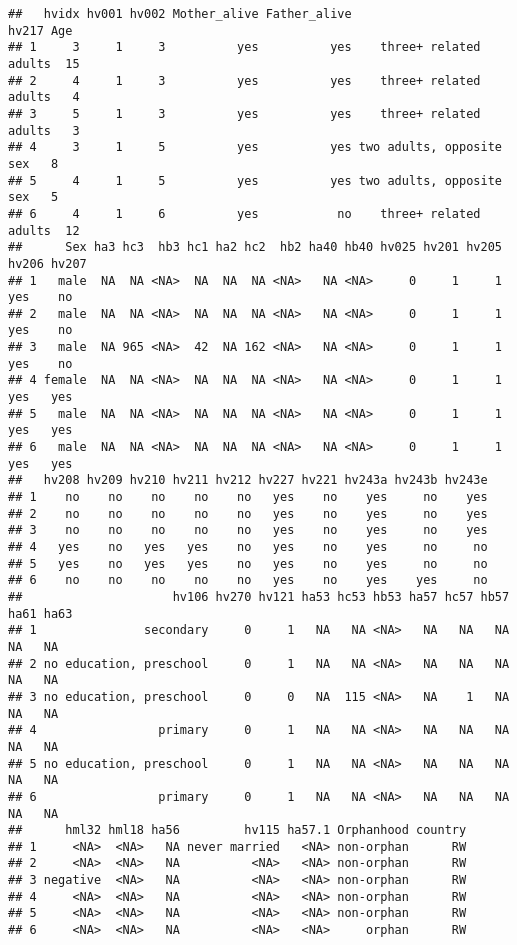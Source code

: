 \documentclass[
]{article}
\begin{document}
\begin{verbatim}
##   hvidx hv001 hv002 Mother_alive Father_alive                    hv217 Age
## 1     3     1     3          yes          yes    three+ related adults  15
## 2     4     1     3          yes          yes    three+ related adults   4
## 3     5     1     3          yes          yes    three+ related adults   3
## 4     3     1     5          yes          yes two adults, opposite sex   8
## 5     4     1     5          yes          yes two adults, opposite sex   5
## 6     4     1     6          yes           no    three+ related adults  12
##      Sex ha3 hc3  hb3 hc1 ha2 hc2  hb2 ha40 hb40 hv025 hv201 hv205 hv206 hv207
## 1   male  NA  NA <NA>  NA  NA  NA <NA>   NA <NA>     0     1     1   yes    no
## 2   male  NA  NA <NA>  NA  NA  NA <NA>   NA <NA>     0     1     1   yes    no
## 3   male  NA 965 <NA>  42  NA 162 <NA>   NA <NA>     0     1     1   yes    no
## 4 female  NA  NA <NA>  NA  NA  NA <NA>   NA <NA>     0     1     1   yes   yes
## 5   male  NA  NA <NA>  NA  NA  NA <NA>   NA <NA>     0     1     1   yes   yes
## 6   male  NA  NA <NA>  NA  NA  NA <NA>   NA <NA>     0     1     1   yes   yes
##   hv208 hv209 hv210 hv211 hv212 hv227 hv221 hv243a hv243b hv243e
## 1    no    no    no    no    no   yes    no    yes     no    yes
## 2    no    no    no    no    no   yes    no    yes     no    yes
## 3    no    no    no    no    no   yes    no    yes     no    yes
## 4   yes    no   yes   yes    no   yes    no    yes     no     no
## 5   yes    no   yes   yes    no   yes    no    yes     no     no
## 6    no    no    no    no    no   yes    no    yes    yes     no
##                     hv106 hv270 hv121 ha53 hc53 hb53 ha57 hc57 hb57 ha61 ha63
## 1               secondary     0     1   NA   NA <NA>   NA   NA   NA   NA   NA
## 2 no education, preschool     0     1   NA   NA <NA>   NA   NA   NA   NA   NA
## 3 no education, preschool     0     0   NA  115 <NA>   NA    1   NA   NA   NA
## 4                 primary     0     1   NA   NA <NA>   NA   NA   NA   NA   NA
## 5 no education, preschool     0     1   NA   NA <NA>   NA   NA   NA   NA   NA
## 6                 primary     0     1   NA   NA <NA>   NA   NA   NA   NA   NA
##      hml32 hml18 ha56         hv115 ha57.1 Orphanhood country
## 1     <NA>  <NA>   NA never married   <NA> non-orphan      RW
## 2     <NA>  <NA>   NA          <NA>   <NA> non-orphan      RW
## 3 negative  <NA>   NA          <NA>   <NA> non-orphan      RW
## 4     <NA>  <NA>   NA          <NA>   <NA> non-orphan      RW
## 5     <NA>  <NA>   NA          <NA>   <NA> non-orphan      RW
## 6     <NA>  <NA>   NA          <NA>   <NA>     orphan      RW
\end{verbatim}
\end{document}
